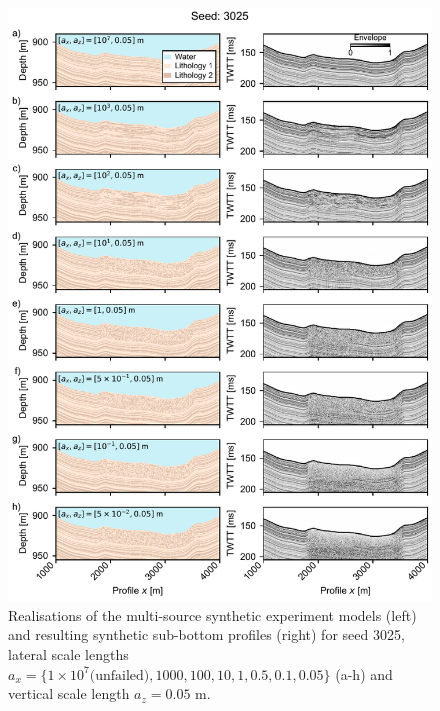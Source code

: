 \documentclass[se,manuscript]{copernicus}
\begin{document}
\begin{figure}
    \includegraphics{figures/si_fig08.pdf}
    \caption{Realisations of the multi-source synthetic experiment models (left) and resulting synthetic sub-bottom profiles (right) for seed 3025, lateral scale lengths $a_x=\{1 \times 10^7 \text{(unfailed)}, 1000, 100, 10, 1, 0.5, 0.1, 0.05\}$ (a-h) and vertical scale length $a_z=0.05$ m.}
    \label{fig:multi-source-3025}
\end{figure}

\clearpage
\end{document}

